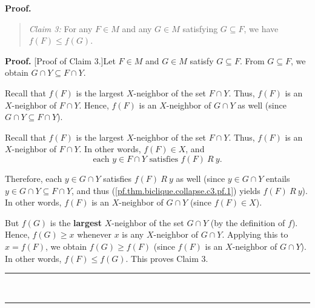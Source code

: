 \documentclass[numbers=enddot,12pt,final,onecolumn,notitlepage]{scrartcl}%
\theoremstyle{definition}
\newenvironment{statement}{\begin{quote}}{\end{quote}}
\newenvironment{proof}[1][Proof]{\noindent\textbf{#1.} }{\ \rule{0.5em}{0.5em}}
\newenvironment{verlong}{}{}
\newenvironment{vershort}{}{}
\begin{document}
\begin{proof}
\begin{statement}
\textit{Claim 3:} For any $F\in M$ and any $G\in M$ satisfying $G\subseteq F$,
we have $f\left(  F\right)  \leq f\left(  G\right)  $.
\end{statement}

\begin{proof}
[Proof of Claim 3.]Let $F\in M$ and $G\in M$ satisfy $G\subseteq F$. From
$G\subseteq F$, we obtain $G\cap Y\subseteq F\cap Y$.

\begin{vershort}
Recall that $f\left(  F\right)  $ is the largest $X$-neighbor of the set
$F\cap Y$. Thus, $f\left(  F\right)  $ is an $X$-neighbor of $F\cap Y$. Hence,
$f\left(  F\right)  $ is an $X$-neighbor of $G\cap Y$ as well (since $G\cap
Y\subseteq F\cap Y$).
\end{vershort}

\begin{verlong}
Recall that $f\left(  F\right)  $ is the largest $X$-neighbor of the set
$F\cap Y$. Thus, $f\left(  F\right)  $ is an $X$-neighbor of $F\cap Y$. In
other words, $f\left(  F\right)  \in X$, and%
\begin{equation}
\text{each }y\in F\cap Y\text{ satisfies }f\left(  F\right)  \ R\ y.
\label{pf.thm.biclique.collapse.c3.pf.1}%
\end{equation}


Therefore, each $y\in G\cap Y$ satisfies $f\left(  F\right)  \ R\ y$ as well
(since $y\in G\cap Y$ entails $y\in G\cap Y\subseteq F\cap Y$, and thus
(\ref{pf.thm.biclique.collapse.c3.pf.1}) yields $f\left(  F\right)  \ R\ y$).
In other words, $f\left(  F\right)  $ is an $X$-neighbor of $G\cap Y$ (since
$f\left(  F\right)  \in X$).
\end{verlong}

But $f\left(  G\right)  $ is the \textbf{largest} $X$-neighbor of the set
$G\cap Y$ (by the definition of $f$). Hence, $f\left(  G\right)  \geq x$
whenever $x$ is any $X$-neighbor of $G\cap Y$. Applying this to $x=f\left(
F\right)  $, we obtain $f\left(  G\right)  \geq f\left(  F\right)  $ (since
$f\left(  F\right)  $ is an $X$-neighbor of $G\cap Y$). In other words,
$f\left(  F\right)  \leq f\left(  G\right)  $. This proves Claim 3.
\end{proof}


\end{proof}
\end{document}
